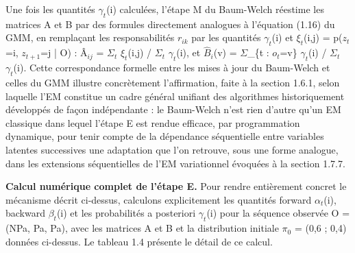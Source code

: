 Une fois les quantités $\gamma _{t}$(i) calculées, l'étape M du Baum-Welch réestime les matrices A et B par des formules directement analogues à l'équation (1.16) du GMM, en remplaçant les responsabilités $r_{ik}$ par les quantités $\gamma _{t}$(i) et $\xi _{t}$(i,j) = p($z_{t}$=i, $z_{t+1}$=j | O) : Â$_{ij}$ = $\Sigma _{t}$ $\xi _{t}$(i,j) / $\Sigma _{t}$ $\gamma _{t}$(i), et $\hat{B}$$_{i}$(v) = $\Sigma $\_\{t : $o_{t}$=v\} $\gamma _{t}$(i) / $\Sigma _{t}$ $\gamma _{t}$(i). Cette correspondance formelle entre les mises à jour du Baum-Welch et celles du GMM illustre concrètement l'affirmation, faite à la section 1.6.1, selon laquelle l'EM constitue un cadre général unifiant des algorithmes historiquement développés de façon indépendante : le Baum-Welch n'est rien d'autre qu'un EM classique dans lequel l'étape E est rendue efficace, par programmation dynamique, pour tenir compte de la dépendance séquentielle entre variables latentes successives  une adaptation que l'on retrouve, sous une forme analogue, dans les extensions séquentielles de l'EM variationnel évoquées à la section 1.7.7.

\textbf{Calcul numérique complet de l'étape E. }Pour rendre entièrement concret le mécanisme décrit ci-dessus, calculons explicitement les quantités forward $\alpha _{t}$(i), backward $\beta _{t}$(i) et les probabilités a posteriori $\gamma _{t}$(i) pour la séquence observée O = (NPa, Pa, Pa), avec les matrices A et B et la distribution initiale $\pi _{0}$ = (0,6 ; 0,4) données ci-dessus. Le tableau 1.4 présente le détail de ce calcul.

